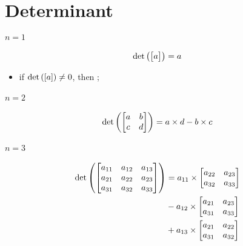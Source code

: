 \section{Determinant}

\paragraph{$ n = 1 $}
\begin{equation}
  \operatorname{det} 
  \left( 
    \begin{bmatrix}
      a
    \end{bmatrix}
  \right) = a
\end{equation}

\begin{itemize}
  \item if $ \operatorname{det} \left( \left[ a \right] \right) \ne 0 $, then 
  ;
\end{itemize}

\paragraph{$ n = 2 $}

\begin{equation}
  \operatorname{det}
  \left( 
    \begin{bmatrix}
      a & b \\ 
      c & d
    \end{bmatrix}
  \right) = a \times d - b \times c
\end{equation}

\paragraph{$ n = 3 $}

\begin{align*}
  \operatorname{det}
  \left( 
    \begin{bmatrix}
      a_{11} & a_{12} & a_{13} \\ 
      a_{21} & a_{22} & a_{23} \\ 
      a_{31} & a_{32} & a_{33}
    \end{bmatrix}
  \right)
  &= 
  a_{11} \times 
  \begin{bmatrix}
    a_{22} & a_{23} \\ 
    a_{32} & a_{33}
  \end{bmatrix} \\
  &-
  a_{12} \times 
  \begin{bmatrix}
    a_{21} & a_{23} \\ 
    a_{31} & a_{33}
  \end{bmatrix} \\
  &+
  a_{13} \times 
  \begin{bmatrix}
    a_{21} & a_{22} \\ 
    a_{31} & a_{32}
  \end{bmatrix}
\end{align*}

